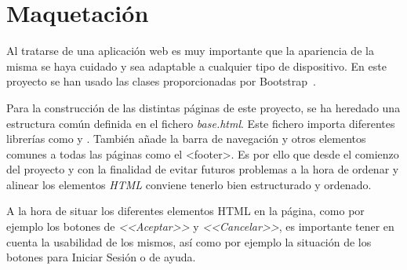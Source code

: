 \section{Maquetación}
Al tratarse de una aplicación web es muy importante que la apariencia de la misma se haya cuidado y sea adaptable a cualquier tipo de dispositivo. En este proyecto se han usado las clases proporcionadas por Bootstrap~\cite{doc:bootstrap}.


Para la construcción de las distintas páginas de este proyecto, se ha heredado una estructura común definida en el fichero \textit{base.html}. Este fichero importa diferentes librerías como  y . También añade la barra de navegación y otros elementos comunes a todas las páginas como el <footer>. Es por ello que desde el comienzo del proyecto y con la finalidad de evitar futuros problemas a la hora de ordenar y alinear los elementos \textit{HTML} conviene tenerlo bien estructurado y ordenado. 


A la hora de situar los diferentes elementos HTML en la página, como por ejemplo los botones de \textit{<<Aceptar>>} y \textit{<<Cancelar>>}, es importante tener en cuenta la usabilidad de los mismos, así como por ejemplo la situación de los botones para Iniciar Sesión o de ayuda.

